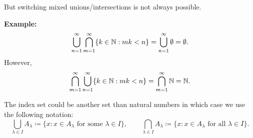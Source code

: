 \documentclass[10pt,aspectratio=149]{beamer}
\begin{document}
\begin{frame}
But switching mixed unions/intersections is not always possible.

\medskip
\pause

\textbf{Example:}
\begin{equation*}
\bigcup_{n=1}^\infty
\bigcap_{m=1}^\infty
\{ k \in {\mathbb{N}} : mk < n \}
=
\bigcup_{n=1}^\infty \emptyset = \emptyset .
\end{equation*}
\pause
However,
\begin{equation*}
\bigcap_{m=1}^\infty
\bigcup_{n=1}^\infty
\{ k \in {\mathbb{N}} : mk < n \}
=
\bigcap_{m=1}^\infty
{\mathbb{N}}
=
{\mathbb{N}}.
\end{equation*}

\pause
The index set could be another set than natural numbers in which case we use
the following notation:
\begin{equation*}
\bigcup_{\lambda \in I} A_\lambda \coloneqq \{ x : x \in A_\lambda \text{ for some }
\lambda \in I
\} ,
\qquad
\bigcap_{\lambda \in I} A_\lambda \coloneqq \{ x : x \in A_\lambda \text{ for all }
\lambda \in I
\} .
\end{equation*}

\end{frame}
\end{document}
